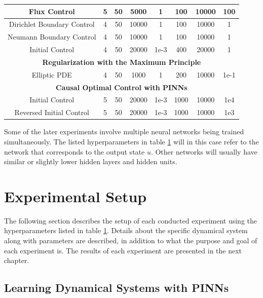 \begin{table}[H]
\begin{adjustwidth}{-1cm}{-1cm}
\begin{tabular}{ |c|c|c|c|c|c|c|c| }
        \hline
        Flux Control & 5 & 50 & 5000 & 1 & 100 & 10000 & 100 \\
        \hline
        Dirichlet Boundary Control & 4 & 50 & 10000 & 1 & 100 & 10000 & 1 \\
        \hline
        Neumann Boundary Control & 4 & 50 & 10000 & 1 & 100 & 10000 & 1 \\
        \hline
        Initial Control & 4 & 50 & 20000 & 1e-3 & 400 & 20000 & 1 \\
        \hline
        \hline
        \multicolumn{8}{|c|}{\textbf{Regularization with the Maximum Principle}} \\
        \hline
        \hline
        Elliptic PDE & 4 & 50 & 1000 & 1 & 200 & 10000 & 1e-1 \\
        \hline
        \hline
        \multicolumn{8}{|c|}{\textbf{Causal Optimal Control with PINNs}} \\
        \hline
        \hline
        Initial Control & 5 & 50 & 20000 & 1e-3 & 1000 & 10000 & 1e4 \\
        \hline
        Reversed Initial Control & 5 & 50 & 20000 & 1e-3 & 1000 & 10000 & 1e3 \\
        \hline
    \end{tabular}
    \label{table:hyperparameters}
    \end{adjustwidth}
\end{table}

Some of the later experiments involve multiple neural networks being trained simultaneously. The listed hyperparameters in table \ref{table:hyperparameters} will in this case refer to the network that corresponds to the output state $u$. Other networks will usually have similar or slightly lower hidden layers and hidden units.

\section{Experimental Setup}

The following section describes the setup of each conducted experiment using the hyperparameters listed in table \ref{table:hyperparameters}. Details about the specific dynamical system along with parameters are described, in addition to what the purpose and goal of each experiment is. The results of each experiment are presented in the next chapter.

\subsection{Learning Dynamical Systems with PINNs}
\label{sec:method_learning_systems}

